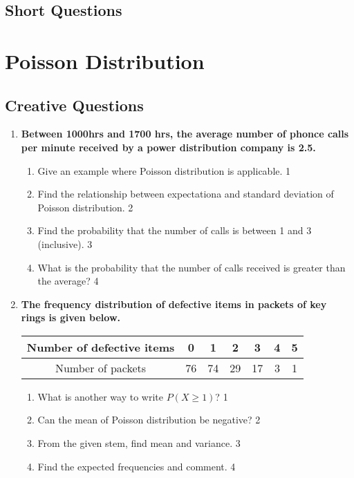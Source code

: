 \documentclass[a4paper,oneside, margin=1.4in]{book}
\begin{document}
\section{Short Questions}

\chapter{Poisson Distribution} 
\section{Creative Questions}

\begin{enumerate}

   \item
	  \textbf{Between 1000hrs and 1700 hrs, the average number of phonce calls per minute received by a power distribution company is 2.5. } 
  
  \begin{enumerate}
    \item
	Give an example where Poisson distribution is applicable. \hfill 1
    \item
	Find the relationship between expectationa and standard deviation of Poisson distribution. \hfill 2
    \item  
	Find the probability that the number of calls is between 1 and 3 (inclusive). \hfill 3
    \item
	What is the probability that the number of calls received is greater than the average? \hfill 4
  \end{enumerate}
  
     \item
	  \textbf{The frequency distribution of defective items in packets of key rings is given below.} 
	  
	  \begin{table}[h]
	  \centering
\begin{tabular}{c|c|c|c|c|c|c}
Number of defective items & 0 & 1 & 2 & 3 & 4 & 5 \\ \hline
Number of packets & 76 & 74 & 29 & 17 & 3 & 1
\end{tabular}
\end{table}
  
  \begin{enumerate}
    \item
	What is another way to write $P(X \ge 1)$? \hfill 1
    \item
	Can the mean of Poisson distribution be negative? \hfill 2
    \item  
	From the given stem, find mean and variance. \hfill 3
    \item
	Find the expected frequencies and comment. \hfill 4
  \end{enumerate}
  

\end{enumerate}
\end{document}
